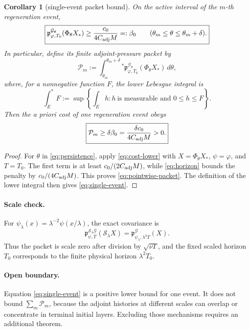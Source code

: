 \documentclass[11pt]{article}
\newcommand{\cG}{\mathcal G}
\newcommand{\cS}{\mathcal S}
\newtheorem{corollary}{Corollary}
\begin{document}
\begin{corollary}[single-event packet bound]
\label{cor:single-event}
On the active interval of the \(m\)-th regeneration event,
\begin{equation}
  \boxed{
  \mathfrak p^{\cG_\theta}_{\varphi,T_0}
    (\Phi_\theta X_*)
  \ge
  \frac{c_0}{4C_{\rm adj}M}
  =:\beta_0
  \qquad
  (\theta_m\le\theta\le\theta_m+\delta).}
  \label{eq:pointwise-packet}
\end{equation}
In particular, define its finite adjoint-pressure packet by
\begin{equation}
  \boxed{
  \mathcal P_m
  :=
  \int_{\theta_m}^{\theta_m+\delta}{}^{\!*}
  \mathfrak p^{\cG_\theta}_{\varphi,T_0}
    (\Phi_\theta X_*)\,d\theta,}
  \label{eq:packet}
\end{equation}
where, for a nonnegative function \(F\), the lower Lebesgue integral is
\[
  \int_E^{\!*}F
  :=
  \sup\left\{
    \int_E h:
    h\ \text{is measurable and }0\le h\le F
  \right\}.
\]
Then the a priori cost of one regeneration event obeys
\begin{equation}
  \boxed{
  \mathcal P_m
  \ge
  \delta\beta_0
  =
  \frac{\delta c_0}{4C_{\rm adj}M}
  >0.}
  \label{eq:single-event}
\end{equation}
\end{corollary}

\begin{proof}
For \(\theta\) in \eqref{eq:persistence}, apply
\eqref{eq:cost-lower} with \(X=\Phi_\theta X_*\),
\(\psi=\varphi\), and \(T=T_0\).  The first term is at least
\(c_0/(2C_{\rm adj}M)\), while \eqref{eq:horizon} bounds the penalty by
\(c_0/(4C_{\rm adj}M)\).  This proves
\eqref{eq:pointwise-packet}.  The definition of the lower integral then
gives \eqref{eq:single-event}.
\end{proof}

\paragraph{Scale check.}
For
\(\psi_\lambda(x)=\lambda^{-2}\psi(x/\lambda)\), the exact covariance is
\[
  \boxed{
  \mathfrak p^{\cS_\lambda\cG}_{\psi,T}
    (\cS_\lambda X)
  =
  \mathfrak p^\cG_{\psi_\lambda,\lambda^2T}(X).}
\]
Thus the packet is scale zero after division by \(\sqrt{\nu T}\), and
the fixed scaled horizon \(T_0\) corresponds to the finite physical
horizon \(\lambda^2T_0\).

\paragraph{Open boundary.}
Equation \eqref{eq:single-event} is a positive lower bound for one event.
It does not bound \(\sum_m\mathcal P_m\), because the adjoint histories
at different scales can overlap or concentrate in terminal initial
layers.  Excluding those mechanisms requires an additional theorem.
\end{document}
